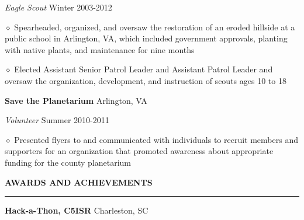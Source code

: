 \documentclass[executivepaper]{extarticle}
\begin{document}
\begin{center}
{\begin{minipage}{7.0in}
\vspace{0.25mm}

{\noindent \textit{\fontsize{12}{8}\selectfont Eagle Scout}} {\hfill \fontsize{10}{8}\selectfont Winter 2003-2012}

\vspace{0.25mm}

{\noindent $\diamond$ {\fontsize{12}{8}\selectfont Spearheaded, organized, and oversaw the restoration of an eroded hillside at a public school in Arlington, VA, which included government
approvals, planting with native plants, and maintenance for nine months}}

{\noindent $\diamond$ {\fontsize{12}{8}\selectfont Elected Assistant Senior Patrol Leader and Assistant Patrol Leader and oversaw the organization, development, and instruction of scouts ages 10 to 18}}

\vspace{2mm}

{\noindent \textbf{\fontsize{12}{8}\selectfont Save the Planetarium}} {\hfill \fontsize{10}{8}\selectfont Arlington, VA}

\vspace{0.25mm}

{\noindent \textit{\fontsize{12}{8}\selectfont Volunteer}} {\hfill \fontsize{10}{8}\selectfont Summer 2010-2011}

\vspace{0.25mm}

{\noindent $\diamond$ {\fontsize{12}{8}\selectfont Presented flyers to and communicated with individuals to recruit members and supporters for an organization that promoted awareness about appropriate funding
for the county planetarium}}

\vspace{3mm}


{\noindent \textbf{\fontsize{12}{9}\selectfont AWARDS AND ACHIEVEMENTS}}

\vspace{-3mm}

\noindent \rule{\textwidth}{0.5pt}

\vspace{1mm}

{\noindent \textbf{\fontsize{12}{8}\selectfont Hack-a-Thon, C5ISR}} {\hfill \fontsize{10}{8}\selectfont Charleston, SC}


\end{minipage}}
\end{center}
\end{document}
